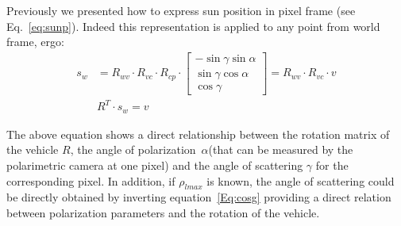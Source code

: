 Previously we presented how to express sun position in pixel frame (see
Eq.~\ref{eq:sunp}). Indeed this representation is applied to any point from
world frame, ergo:
\begin{equation}
  \label{eq:Rwv}
  \begin{split}
    s_{w} & = R_{wv} \cdot R_{vc} \cdot R_{cp} \cdot
    \begin{bmatrix}
    -\sin\gamma \sin\alpha\\
    \sin\gamma \cos\alpha\\
    \cos\gamma
  \end{bmatrix} = R_{wv} \cdot R_{vc} \cdot v\\
    & R^{T} \cdot s_{w}  = v
  \end{split}
\end{equation}

The above equation shows a direct relationship between the rotation matrix of the vehicle $R$,
the angle of polarization~$\alpha$(that can be measured by the polarimetric camera at one pixel) and the
angle of scattering $\gamma$ for the corresponding pixel. In addition, if $\rho_{lmax}$ is known,
the angle of scattering could be directly obtained by inverting equation~\ref{Eq:cosg} providing a direct relation
between polarization parameters and the rotation of the vehicle.

